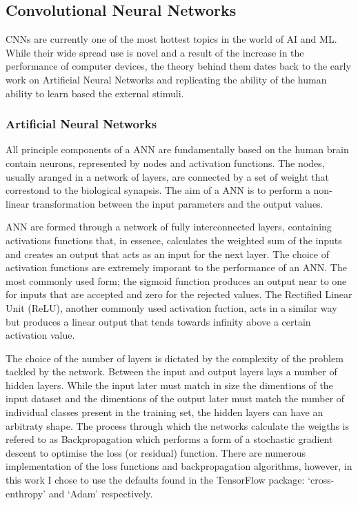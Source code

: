 \subsection{Convolutional Neural Networks} \label{sec:CNN}
CNNs are currently one of the most hottest topics in the world of AI and ML. While their wide spread use is novel and a result of the increase in the performance of computer devices, the theory behind them dates back to the early work on Artificial Neural Networks \citep[ANN;][]{Mcculloch1943} and replicating the ability of the human ability to learn based the external stimuli.

\subsubsection{Artificial Neural Networks}
All principle components of a ANN are fundamentally based on the human brain contain neurons, represented by nodes and activation functions. The nodes, usually aranged in a network of layers, are connected by a set of weight that correstond to the biological synapsis. The aim of a ANN is to perform a non-linear transformation between the input parameters and the output values.

ANN are formed through a network of fully interconnected layers, containing activations functions that, in essence, calculates the weighted sum of the inputs and creates an output that acts as an input for the next layer. The choice of activation functions are extremely imporant to the performance of an ANN. The most commonly used form; the sigmoid function produces an output near to one for inputs that are accepted and zero for the rejected values. The Rectified Linear Unit (ReLU), another commonly used activation fuction, acts in a similar way but produces a linear output that tends towards infinity above a certain activation value.

The choice of the number of layers is dictated by the complexity of the problem tackled by the network. Between the input and output layers lays a number of hidden layers. While the input later must match in size the dimentions of the input dataset and the dimentions of the output later must match the number of individual classes present in the training set, the hidden layers can have an arbitraty shape. The process through which the networks calculate the weigths is refered to as Backpropagation which performs a form of a stochastic gradient descent to optimise the loss (or residual) function. There are numerous implementation of the loss functions and backpropagation algorithms, however, in this work I chose to use the defaults found in the TensorFlow package: `cross-enthropy' and `Adam' respectively.


